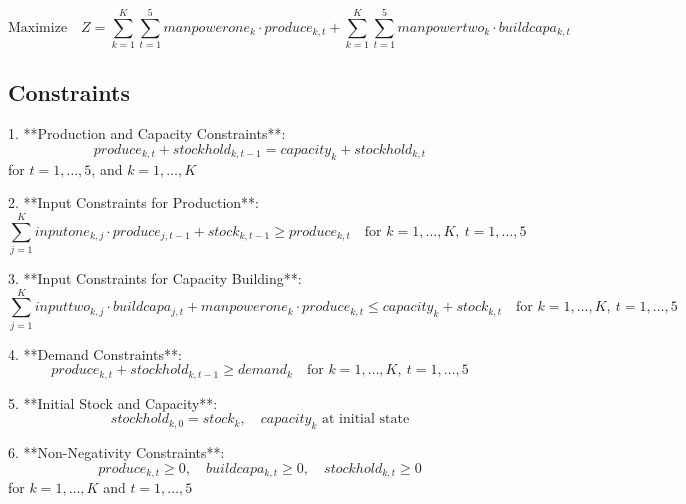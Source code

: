 \documentclass{article}
\begin{document}
\[
\text{Maximize} \quad Z = \sum_{k=1}^{K} \sum_{t=1}^{5} manpowerone_{k} \cdot produce_{k, t} + \sum_{k=1}^{K} \sum_{t=1}^{5} manpowertwo_{k} \cdot buildcapa_{k, t}
\]

\subsection*{Constraints}

1. **Production and Capacity Constraints**:
   \[
   produce_{k, t} + stockhold_{k, t-1} = capacity_{k} + stockhold_{k, t}
   \]
   for \( t = 1, \ldots, 5 \), and \( k = 1, \ldots, K \)

2. **Input Constraints for Production**:
   \[
   \sum_{j=1}^{K} inputone_{k,j} \cdot produce_{j, t-1} + stock_{k, t-1} \geq produce_{k, t} \quad \text{for } k=1,\ldots,K, \ t=1,\ldots,5
   \]

3. **Input Constraints for Capacity Building**:
   \[
   \sum_{j=1}^{K} inputtwo_{k,j} \cdot buildcapa_{j, t} + manpowerone_{k} \cdot produce_{k,t} \leq capacity_{k} + stock_{k,t} \quad \text{for }  k=1,\ldots,K, \ t=1,\ldots,5
   \]

4. **Demand Constraints**:
   \[
   produce_{k, t} + stockhold_{k, t-1} \geq demand_{k} \quad \text{for } k=1,\ldots,K, \ t=1,\ldots,5
   \]

5. **Initial Stock and Capacity**:
   \[
   stockhold_{k, 0} = stock_{k}, \quad capacity_{k} \text{ at initial state}
   \]

6. **Non-Negativity Constraints**:
   \[
   produce_{k, t} \geq 0, \quad buildcapa_{k, t} \geq 0, \quad stockhold_{k, t} \geq 0
   \]
   for \( k = 1, \ldots, K \) and \( t = 1, \ldots, 5 \)
\end{document}
